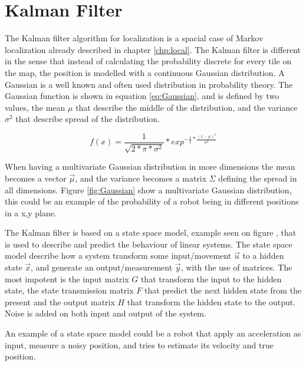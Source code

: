 \chapter{Kalman Filter}
\label{chp:kalman}

The Kalman filter algorithm for localization is a spacial case of Markov localization already described in chapter \ref{chp:local}.
The Kalman filter is different in the sense that instead of calculating the probability discrete for every tile on the map, the position is modelled with a continuous Gaussian distribution.
A Gaussian is a well known and often used distribution in probability theory.
The Gaussian function is shown in equation \ref{eq:Gaussian}, and is defined by two values, the mean \emph{$\mu$} that describe the middle of the distribution, and the variance \emph{$\sigma^2$} that describe spread of the distribution.

\begin{equation}
\label{eq:Gaussian}
f(x) = \frac{1}{\sqrt{2*\pi*\sigma^2}} * exp^{-\frac{1}{2}*\frac{(x-\mu)^2}{\sigma^2}}
\end{equation}

When having a multivariate Gaussian distribution in more dimensions the mean becomes a vector \emph{$\vec{\mu}$}, and the variance becomes a matrix \emph{$\Sigma$} defining the spread in all dimensions.
Figure \ref{fig:Gaussian} show a multivariate Gaussian distribution, this could be an example of the probability of a robot being in different positions in a x,y plane.


The Kalman filter is based on a state space model, example seen on figure , that is used to describe and predict the behaviour of linear systems.
The state space model describe how a system transform some input/movement \emph{$\vec{u}$} to a hidden state \emph{$\vec{x}$}, and generate an output/measurement \emph{$\vec{y}$}, with the use of matrices. The most impotent is the input matrix \emph{$G$} that transform the input to the hidden state, the state transmission matrix \emph{$F$} that predict the next hidden state from the present and the output matrix \emph{$H$} that transform the hidden state to the output. Noise is added on both input and output of the system.

An example of a state space model could be a robot that apply an acceleration as input, measure a noisy position, and tries to estimate its velocity and true position.

